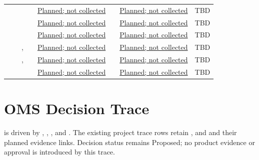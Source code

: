 \begin{landscape}
\begin{tabularx}{\linewidth}{L{1.7cm}L{2.3cm}L{2.5cm}L{1.8cm}YL{1.8cm}YL{1.4cm}}
 &  &  &  & \hyperref[PlannedEvidence:VER-024]{Planned; not collected} &  & \hyperref[PlannedEvidence:VAL-004]{Planned; not collected} & TBD\\
 &  &  &  & \hyperref[PlannedEvidence:VER-025]{Planned; not collected} &  & \hyperref[PlannedEvidence:VAL-004]{Planned; not collected} & TBD\\
 &  &  &  & \hyperref[PlannedEvidence:VER-025]{Planned; not collected} &  & \hyperref[PlannedEvidence:VAL-007]{Planned; not collected} & TBD\\
 &  & ,  &  & \hyperref[PlannedEvidence:VER-026]{Planned; not collected} &  & \hyperref[PlannedEvidence:VAL-004]{Planned; not collected} & TBD\\
 &  & ,  &  & \hyperref[PlannedEvidence:VER-026]{Planned; not collected} &  & \hyperref[PlannedEvidence:VAL-005]{Planned; not collected} & TBD\\
 &  &  &  & \hyperref[PlannedEvidence:VER-027]{Planned; not collected} &  & \hyperref[PlannedEvidence:VAL-008]{Planned; not collected} & TBD\\
\end{tabularx}
\normalsize\end{landscape}
\section{OMS Decision Trace}
 is driven by ,
, , 
and . The existing project trace rows retain
,  and 
and their planned evidence links. Decision status remains Proposed; no product
evidence or approval is introduced by this trace.
